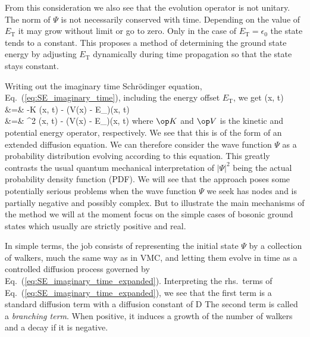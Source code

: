 From this consideration we also see that the evolution operator is not
unitary. The norm of $\Psi$ is not necessarily conserved with time.
Depending on the value of $E_{\mathrm{T}}$ it may grow without limit
or go to zero. Only in the case of $E_{\mathrm{T}}=\epsilon_0$ the
state tends to a constant. This proposes a method of determining the
ground state energy by adjusting $E_{\mathrm{T}}$ dynamically during
time propagation so that the state stays constant.

Writing out the imaginary time Schr\"odinger equation,
Eq.~(\ref{eq:SE_imaginary_time}), including the energy offset 
$E_\mathrm{T}$, we get
\bea
{}\Psi(\vec x, t) &=&
-\op K \Psi(\vec x, t) -
(\op V(\vec x) - E_)\Psi(\vec x, t)\nonumber\\
&=&
\nabla^2 \Psi(\vec x, t) -
(\op V(\vec x) - E_)\Psi(\vec x, t)
\label{eq:SE_imaginary_time_expanded}
\eea
where $\op K$ and $\op V$ is the kinetic and potential energy
operator, respectively. We see that this is of the form of an extended
diffusion equation. We can therefore consider the wave function $\Psi$
as a probability distribution evolving according to this equation.
This greatly contrasts the usual quantum mechanical interpretation of
$|\Psi|^2$ being the actual probability density function (PDF). We
will see that the approach poses some potentially serious problems
when the wave function $\Psi$ we seek has nodes and is partially
negative and possibly complex. But to illustrate the main mechanisms
of the method we will at the moment focus on the simple cases of
bosonic ground states which usually are strictly positive and real.

In simple terms, the job consists of representing the initial state
$\Psi$ by a collection of walkers, much the same way as in VMC, and
letting them evolve in time as a controlled diffusion process governed
by Eq.~(\ref{eq:SE_imaginary_time_expanded}). Interpreting the
rhs.~terms of Eq.~(\ref{eq:SE_imaginary_time_expanded}), we see that
the first term is a standard diffusion term with a diffusion constant
of
\be
D\equiv{}
\label{eq:diffusion_constant}
\ee
The second term is called a \emph{branching term}. When positive, it
induces a growth of the number of walkers and a decay if it is negative.

